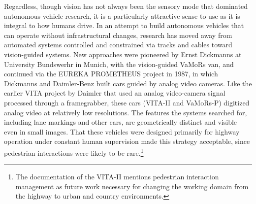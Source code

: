 Regardless, though vision has not always been the sensory mode that dominated
autonomous vehicle research, it is a particularly attractive sense to
use as it is integral to how humans drive. In an attempt to build
autonomous vehicles that can operate without infrastructural changes,
research has moved away from automated systems controlled and
constrained via tracks and cables toward vision-guided
systems. New approaches were pioneered by Ernst Dickmanns at
University Bundswerhr in Munich, with the vision-guided VaMoRs van,
and continued via the EUREKA PROMETHEUS project in 1987, in which
Dickmanns and Daimler-Benz built cars guided by analog video
cameras.\cite{???} Like the earlier VITA project by Daimler that used an
analog video-camera signal processed through a framegrabber, these
cars (VITA-II and VaMoRs-P) digitized analog video at relatively low resolutions. The
features the systems searched for, including lane markings and other
cars, are geometrically distinct and visible even in small
images.\cite{???} That these vehicles were designed primarily for
highway operation under constant human supervision made this strategy
acceptable, since pedestrian interactions were likely to be
rare.\footnote{The documentation of the VITA-II mentions pedestrian
  interaction management as future work necessary for changing the
  working domain from the highway to urban and country environments.\cite{???}}


